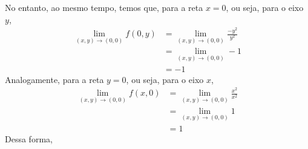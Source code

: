 \documentclass[../main.tex]{subfiles}
\begin{document}
\begin{solucao}
\begin{enumerate}[label=\alph*)]
				No entanto, ao mesmo tempo, temos que, para a reta $x=0$, ou seja, para o eixo $y$,
				\begin{align*}
					\lim_{(x,y)\to (0,0)} f(0,y) 
					&=\lim_{(x,y)\to (0,0)} \frac{-y^2}{y^2}\\
					&=\lim_{(x,y)\to (0,0)} -1\\
					&=-1
				\end{align*}
				Analogamente, para a reta $y=0$, ou seja, para o eixo $x$,
				\begin{align*}
					\lim_{(x,y)\to (0,0)} f(x,0)
					&=\lim_{(x,y)\to (0,0)} \frac{x^2}{x^2}\\
					&=\lim_{(x,y)\to (0,0)}1\\
					&=1
				\end{align*}
				Dessa forma, 
			\end{enumerate}
		\end{solucao}
\end{document}
